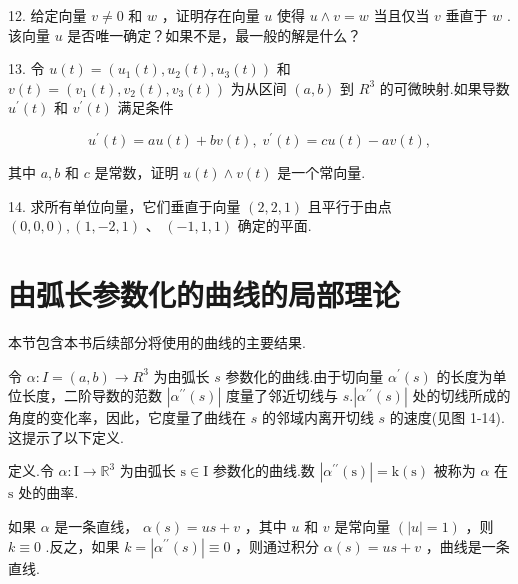 12. 给定向量 \(v \neq  0\) 和 \(w\) ，证明存在向量 \(u\) 使得 \(u \land  v = w\) 当且仅当 \(v\) 垂直于 \(w\) .该向量 \(u\) 是否唯一确定？如果不是，最一般的解是什么？

13. 令 \(u\left( t\right)  = \left( {{u}_{1}\left( t\right) ,{u}_{2}\left( t\right) ,{u}_{3}\left( t\right) }\right)\) 和 \(v\left( t\right)  = \left( {{v}_{1}\left( t\right) ,{v}_{2}\left( t\right) ,{v}_{3}\left( t\right) }\right)\) 为从区间 \(\left( {a,b}\right)\) 到 \({R}^{3}\) 的可微映射.如果导数 \({u}^{\prime }\left( t\right)\) 和 \({v}^{\prime }\left( t\right)\) 满足条件

\[
{u}^{\prime }\left( t\right)  = {au}\left( t\right)  + {bv}\left( t\right) ,\;{v}^{\prime }\left( t\right)  = {cu}\left( t\right)  - {av}\left( t\right) ,
\]

其中 \(a,b\) 和 \(c\) 是常数，证明 \(u\left( t\right)  \land  v\left( t\right)\) 是一个常向量.

14. 求所有单位向量，它们垂直于向量 \(\left( {2,2,1}\right)\) 且平行于由点 \(\left( {0,0,0}\right) ,\left( {1, - 2,1}\right)\) 、 \(\left( {-1,1,1}\right)\) 确定的平面.

\section{由弧长参数化的曲线的局部理论}

本节包含本书后续部分将使用的曲线的主要结果.

令 \(\alpha  : I = \left( {a,b}\right)  \rightarrow  {R}^{3}\) 为由弧长 \(s\) 参数化的曲线.由于切向量 \({\alpha }^{\prime }\left( s\right)\) 的长度为单位长度，二阶导数的范数 \(\left| {{\alpha }^{\prime \prime }\left( s\right) }\right|\) 度量了邻近切线与 \(s.\left| {{\alpha }^{\prime \prime }\left( s\right) }\right|\) 处的切线所成的角度的变化率，因此，它度量了曲线在 \(s\) 的邻域内离开切线 \(s\) 的速度(见图 1-14).这提示了以下定义.

定义.令 \(\alpha  : \mathrm{I} \rightarrow  {\mathbb{R}}^{3}\) 为由弧长 \(\mathrm{s} \in  \mathrm{I}\) 参数化的曲线.数 \(\left| {{\alpha }^{\prime \prime }\left( \mathrm{s}\right) }\right|  = \mathrm{k}\left( \mathrm{s}\right)\) 被称为 \(\alpha\) 在 \(\mathrm{s}\) 处的曲率.

如果 \(\alpha\) 是一条直线， \(\alpha \left( s\right)  = {us} + v\) ，其中 \(u\) 和 \(v\) 是常向量 \(\left( {\left| u\right|  = 1}\right)\) ，则 \(k \equiv  0\) .反之，如果 \(k = \left| {{\alpha }^{\prime \prime }\left( s\right) }\right|  \equiv  0\) ，则通过积分 \(\alpha \left( s\right)  = {us} + v\) ，曲线是一条直线.

